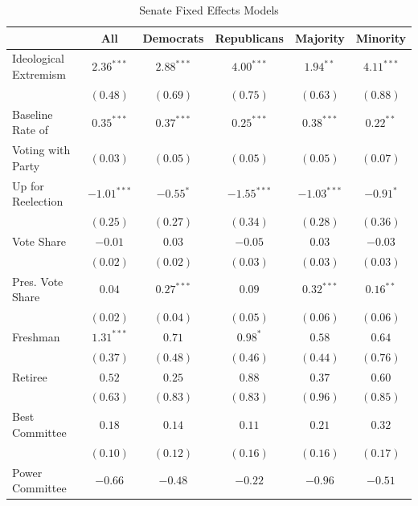 \documentclass[12pt]{article}
\begin{document}
\begin{table}[H]
\centering
\begin{threeparttable}
\label{tab-senate-fixeff}
\singlespacing
\small
\caption{Senate Fixed Effects Models}
\begin{tabular}{l c c c c c }
\hline
& All & Democrats & Republicans & Majority & Minority \\
\hline
Ideological Extremism  & $2.36^{***}$  & $2.88^{***}$ & $4.00^{***}$  & $1.94^{**}$   & $4.11^{***}$ \\
& $(0.48)$      & $(0.69)$     & $(0.75)$      & $(0.63)$      & $(0.88)$     \\
Baseline Rate of               & $0.35^{***}$  & $0.37^{***}$ & $0.25^{***}$  & $0.38^{***}$  & $0.22^{**}$  \\
\hspace{.7em}Voting with Party & $(0.03)$      & $(0.05)$     & $(0.05)$      & $(0.05)$      & $(0.07)$     \\
Up for Reelection     & $-1.01^{***}$ & $-0.55^{*}$  & $-1.55^{***}$ & $-1.03^{***}$ & $-0.91^{*}$  \\
& $(0.25)$      & $(0.27)$     & $(0.34)$      & $(0.28)$      & $(0.36)$     \\
Vote Share             & $-0.01$       & $0.03$       & $-0.05$       & $0.03$        & $-0.03$      \\
& $(0.02)$      & $(0.02)$     & $(0.03)$      & $(0.03)$      & $(0.03)$     \\
Pres. Vote Share       & $0.04$        & $0.27^{***}$ & $0.09$        & $0.32^{***}$  & $0.16^{**}$  \\
& $(0.02)$      & $(0.04)$     & $(0.05)$      & $(0.06)$      & $(0.06)$     \\
Freshman                & $1.31^{***}$  & $0.71$       & $0.98^{*}$    & $0.58$        & $0.64$       \\
& $(0.37)$      & $(0.48)$     & $(0.46)$      & $(0.44)$      & $(0.76)$     \\
Retiree                 & $0.52$        & $0.25$       & $0.88$        & $0.37$        & $0.60$       \\
& $(0.63)$      & $(0.83)$     & $(0.83)$      & $(0.96)$      & $(0.85)$     \\
Best Committee         & $0.18$        & $0.14$       & $0.11$        & $0.21$        & $0.32$       \\
& $(0.10)$      & $(0.12)$     & $(0.16)$      & $(0.16)$      & $(0.17)$     \\
Power Committee        & $-0.66$       & $-0.48$      & $-0.22$       & $-0.96$       & $-0.51$      \\

\end{tabular}
\end{threeparttable}
\end{table}
\end{document}
